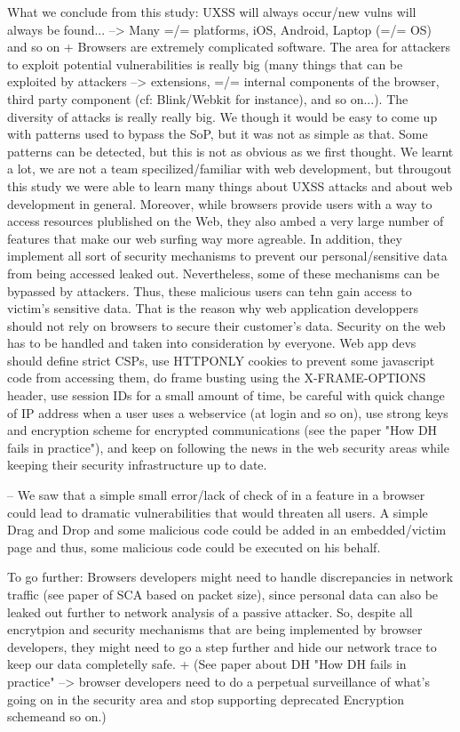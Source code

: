 \documentclass[journal]{IEEEtran}
\begin{document}
What we conclude from this study: UXSS will always occur/new vulns will always be found... --> Many =/= platforms, iOS, Android, Laptop (=/= OS) and so on + Browsers are extremely complicated software. The area for attackers to exploit potential vulnerabilities is really big (many things that can be exploited by attackers --> extensions, =/= internal components of the browser, third party component (cf: Blink/Webkit for instance), and so on...). The diversity of attacks is really really big. We though it would be easy to come up with patterns used to bypass the SoP, but it was not as simple as that. Some patterns can be detected, but this is not as obvious as we first thought.
We learnt a lot, we are not a team specilized/familiar with web development, but througout this study we were able to learn many things about UXSS attacks and about web development in general.
Moreover, while browsers provide users with a way to access resources plublished on the Web, they also ambed a very large number of features that make our web surfing way more agreable. In addition, they implement all sort of security mechanisms to prevent our personal/sensitive data from being accessed leaked out. Nevertheless, some of these mechanisms can be bypassed by attackers. Thus, these malicious users can tehn gain access to victim's sensitive data. That is the reason why web application developpers should not rely on browsers to secure their customer's data. Security on the web has to be handled and taken into consideration by everyone. Web app devs should define strict CSPs, use HTTPONLY cookies to prevent some javascript code from accessing them, do frame busting using the X-FRAME-OPTIONS header, use session IDs for a small amount of time, be careful with quick change of IP address when a user uses a webservice (at login and so on), use strong keys and encryption scheme for encrypted communications (see the paper "How DH fails in practice"), and keep on following the news in the web security areas while keeping their security infrastructure up to date.

-- We saw that a simple small error/lack of check of in a feature in a browser could lead to dramatic vulnerabilities that would threaten all users. A simple Drag and Drop and some malicious code could be added in an embedded/victim page and thus, some malicious code could be executed on his behalf.


To go further: Browsers developers might need to handle discrepancies in network traffic (see paper of SCA based on packet size), since personal data can also be leaked out further to network analysis of a passive attacker. So, despite all encrytpion and security mechanisms that are being implemented by browser developers, they might need to go a step further and hide our network trace to keep our data completelly safe. + (See paper about DH "How DH fails in practice" --> browser developers need to do a perpetual surveillance of what's going on in the security area and stop supporting deprecated Encryption schemeand so on.)
\end{document}
